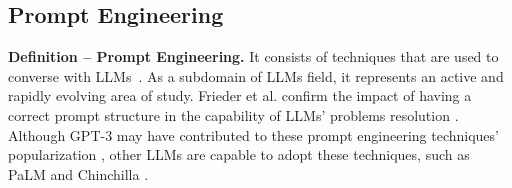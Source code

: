 

\subsection{Prompt Engineering}


\textbf{Definition -- Prompt Engineering.} It consists of techniques that are used to converse with LLMs~\cite{velasquez2023prompt}. As a subdomain of LLMs field, it represents an active and rapidly evolving area of study. Frieder et al. confirm the impact of having a correct prompt structure in the capability of LLMs' problems resolution \cite{10.5555/3666122.3667327}. 
Although GPT-3 may have contributed to these prompt engineering techniques' popularization \cite{10.5555/3495724.3495883}, other LLMs are capable to adopt these techniques, such as PaLM \cite{10.5555/3648699.3648939} and Chinchilla \cite{10.5555/3600270.3602446}.

